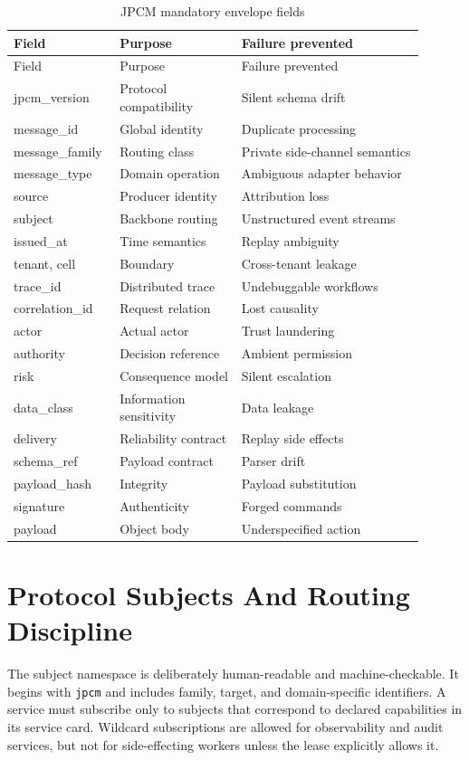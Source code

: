 \documentclass[10pt,journal,onecolumn]{IEEEtran}
\begin{document}
\begin{longtable}{p{0.20\linewidth}p{0.28\linewidth}p{0.42\linewidth}}
\caption{JPCM mandatory envelope fields}\label{tab:envelope}\\
\toprule
Field & Purpose & Failure prevented\\
\midrule
\endfirsthead
\toprule
Field & Purpose & Failure prevented\\
\midrule
\endhead
jpcm\_version & Protocol compatibility & Silent schema drift\\
message\_id & Global identity & Duplicate processing\\
message\_family & Routing class & Private side-channel semantics\\
message\_type & Domain operation & Ambiguous adapter behavior\\
source & Producer identity & Attribution loss\\
subject & Backbone routing & Unstructured event streams\\
issued\_at & Time semantics & Replay ambiguity\\
tenant, cell & Boundary & Cross-tenant leakage\\
trace\_id & Distributed trace & Undebuggable workflows\\
correlation\_id & Request relation & Lost causality\\
actor & Actual actor & Trust laundering\\
authority & Decision reference & Ambient permission\\
risk & Consequence model & Silent escalation\\
data\_class & Information sensitivity & Data leakage\\
delivery & Reliability contract & Replay side effects\\
schema\_ref & Payload contract & Parser drift\\
payload\_hash & Integrity & Payload substitution\\
signature & Authenticity & Forged commands\\
payload & Object body & Underspecified action\\
\bottomrule
\end{longtable}

\section{Protocol Subjects And Routing Discipline}
The subject namespace is deliberately human-readable and machine-checkable. It begins with \texttt{jpcm} and includes family, target, and domain-specific identifiers. A service must subscribe only to subjects that correspond to declared capabilities in its service card. Wildcard subscriptions are allowed for observability and audit services, but not for side-effecting workers unless the lease explicitly allows it.
\end{document}
